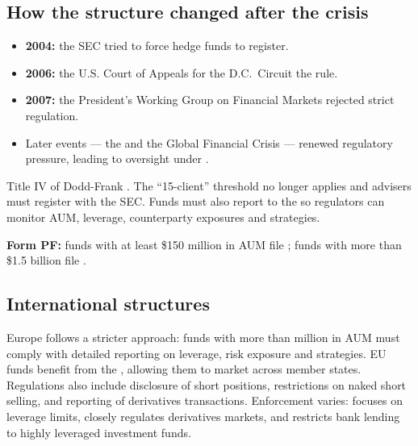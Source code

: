 \subsection{How the structure changed after the crisis}

\begin{itemize}
\item \textbf{2004:} the SEC tried to force hedge funds to register.
\item \textbf{2006:} the U.S. Court of Appeals for the D.C.\ Circuit
 the rule.
\item \textbf{2007:} the President's Working Group on Financial Markets rejected
strict regulation.
\item Later events --- the  and the Global Financial
Crisis --- renewed regulatory pressure, leading to oversight under
.
\end{itemize}

\begin{imkeybox}[title={What Title IV actually did}]
Title IV of Dodd-Frank . The
``15-client'' threshold no longer applies and advisers must register with the SEC.
Funds must also report to the  so
regulators can monitor AUM, leverage, counterparty exposures and strategies.

\smallskip
\textbf{Form PF:} funds with at least \$150 million in AUM file ;
funds with more than \$1.5 billion file .
\end{imkeybox}

\subsection{International structures}

Europe follows a stricter approach: funds with more than  million in AUM
must comply with detailed reporting on leverage, risk exposure and strategies. EU
funds benefit from the , allowing them to market across member
states. Regulations also include disclosure of short positions, restrictions on
naked short selling, and reporting of derivatives transactions. Enforcement varies:
 focuses on leverage limits,  closely regulates
derivatives markets, and  restricts bank lending to highly leveraged
investment funds.

